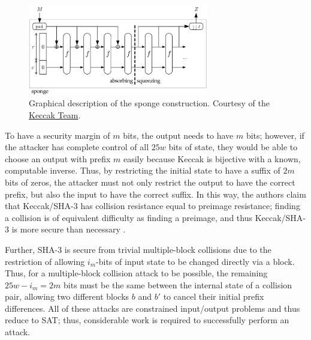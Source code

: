 \documentclass[10pt,twocolumn,twoside]{pnas-new}
\begin{document}
\begin{figure}
\begin{center}
\includegraphics[width=0.7\textwidth]{figs/Sponge-150.png}
\caption{Graphical description of the sponge construction. Courtesy of the
\href{https://keccak.team/images/Sponge-150.png}{Keccak Team}.}
\label{f:s}
\end{center}
\end{figure}

To have a security margin of $m$ bits, the output needs to have $m$ bits;
however, if the attacker has complete control of all $25w$ bits of state,
they would be able to choose an output with prefix $m$ easily because
Keccak is bijective with a known, computable inverse. Thus, by restricting
the initial state to have a suffix of $2m$ bits of zeros, the attacker must
not only restrict the output to have the correct prefix, but also the input
to have the correct suffix. In this way, the authors claim that Keccak/SHA-3
has collision resistance equal to preimage resistance; finding a collision
is of equivalent difficulty as finding a preimage, and thus Keccak/SHA-3 is
more secure than necessary \cite{Keccak3}.

Further, SHA-3 is secure from trivial multiple-block collisions due to the
restriction of allowing $i_{m}$-bits of input state to be changed directly
via a block. Thus, for a multiple-block collision attack to be possible, the
remaining $25w - i_{m} = 2m$ bits must be the same between the internal state
of a collision pair, allowing two different blocks $b$ and $b'$ to cancel
their initial prefix differences. All of these attacks are constrained
input/output problems and thus reduce to SAT; thus, considerable work
is required to successfully perform an attack.



\end{document}
